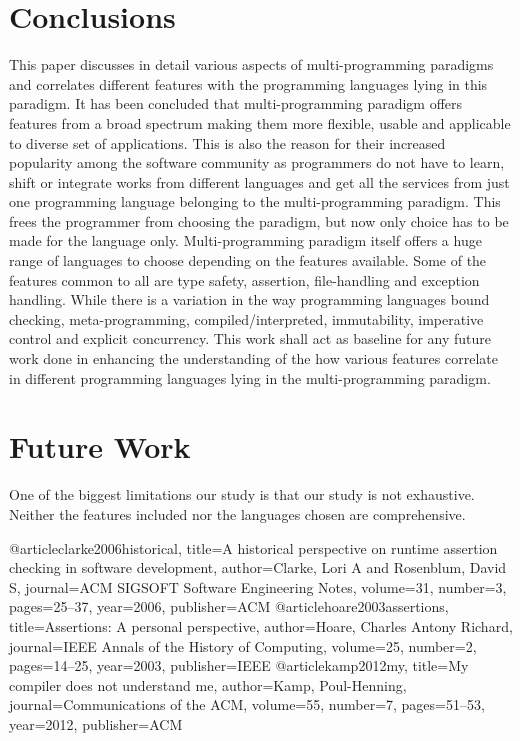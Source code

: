 \documentclass{sig-alternate}
\begin{document}
\section{Conclusions}
This paper discusses in detail various aspects of multi-programming paradigms and correlates different features with the programming languages lying in this paradigm. It has been concluded that multi-programming paradigm offers features from a broad spectrum making them more flexible, usable and applicable to diverse set of applications. This is also the reason for their increased popularity among the software community as programmers do not have to learn, shift or integrate works from different languages and get all the services from just one programming language belonging to the multi-programming paradigm. This frees the programmer from choosing the paradigm, but now only choice has to be made for the language only. Multi-programming paradigm itself offers a huge range of languages to choose depending on the features available. Some of the features common to all are type safety, assertion, file-handling and exception handling. While there is a variation in the way programming languages bound checking, meta-programming, compiled/interpreted, immutability, imperative control and explicit concurrency. This work shall act as baseline for any future work done in enhancing the understanding of the how various features correlate in different programming languages lying in the multi-programming paradigm.

\section{Future Work}
One of the biggest limitations our study is that our study is not exhaustive. Neither the features included nor the languages chosen are comprehensive.

\begin{thebibliography}{9}
\bibitem @article{clarke2006historical,
  title={A historical perspective on runtime assertion checking in software development},
  author={Clarke, Lori A and Rosenblum, David S},
  journal={ACM SIGSOFT Software Engineering Notes},
  volume={31},
  number={3},
  pages={25--37},
  year={2006},
  publisher={ACM}
}
\bibitem @article{hoare2003assertions,
  title={Assertions: A personal perspective},
  author={Hoare, Charles Antony Richard},
  journal={IEEE Annals of the History of Computing},
  volume={25},
  number={2},
  pages={14--25},
  year={2003},
  publisher={IEEE}
}
\bibitem @article{kamp2012my,
  title={My compiler does not understand me},
  author={Kamp, Poul-Henning},
  journal={Communications of the ACM},
  volume={55},
  number={7},
  pages={51--53},
  year={2012},
  publisher={ACM}
}
\end{thebibliography}
\end{document}
